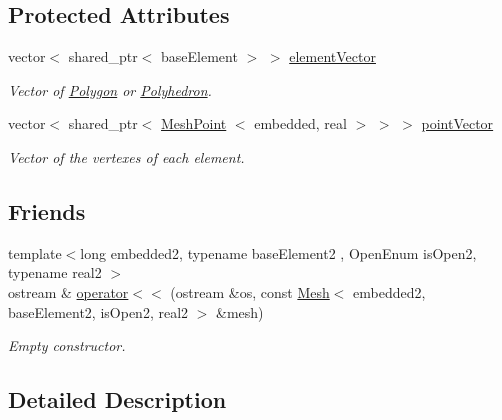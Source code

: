 \subsection*{\-Protected \-Attributes}
\begin{DoxyCompactItemize}
\item 
\hypertarget{class_mesh_aea48e58470e3a72fcc3ee5b26f9c5315}{vector$<$ shared\-\_\-ptr$<$ base\-Element $>$ $>$ \hyperlink{class_mesh_aea48e58470e3a72fcc3ee5b26f9c5315}{element\-Vector}}\label{class_mesh_aea48e58470e3a72fcc3ee5b26f9c5315}

\begin{DoxyCompactList}\small\item\em \-Vector of \hyperlink{class_polygon}{\-Polygon} or \hyperlink{class_polyhedron}{\-Polyhedron}. \end{DoxyCompactList}\item 
\hypertarget{class_mesh_ae132c0131accc25771300cea93e26c01}{vector$<$ shared\-\_\-ptr$<$ \hyperlink{class_mesh_point}{\-Mesh\-Point}\*
$<$ embedded, real $>$ $>$ $>$ \hyperlink{class_mesh_ae132c0131accc25771300cea93e26c01}{point\-Vector}}\label{class_mesh_ae132c0131accc25771300cea93e26c01}

\begin{DoxyCompactList}\small\item\em \-Vector of the vertexes of each element. \end{DoxyCompactList}\end{DoxyCompactItemize}
\subsection*{\-Friends}
\begin{DoxyCompactItemize}
\item 
{\footnotesize template$<$long embedded2, typename base\-Element2 , \-Open\-Enum is\-Open2, typename real2 $>$ }\\ostream \& \hyperlink{class_mesh_a10337641e675a22873fcf8f0ddb7e409}{operator$<$$<$} (ostream \&os, const \hyperlink{class_mesh}{\-Mesh}$<$ embedded2, base\-Element2, is\-Open2, real2 $>$ \&mesh)
\begin{DoxyCompactList}\small\item\em \-Empty constructor. \end{DoxyCompactList}\end{DoxyCompactItemize}


\subsection{\-Detailed \-Description}
